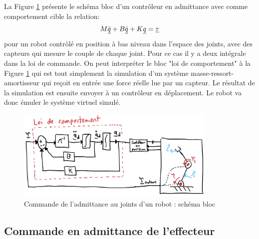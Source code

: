 La Figure \ref{fig:admitancecontroljointspace} présente le schéma bloc d'un contrôleur en admittance avec comme comportement cible la relation:
\begin{align}
M \underline{\ddot{q}} + B \underline{\dot{q}} + K \underline{q} = \underline{\tau}
\end{align}
pour un robot contrôlé en position à bas niveau dans l'espace des joints, avec des capteurs qui mesure le couple de chaque joint. Pour ce cas il y a deux intégrale dans la loi de commande. On peut interpréter le bloc "loi de comportement" à la Figure \ref{fig:admitancecontroljointspace} qui est tout simplement la simulation d'un système masse-ressort-amortisseur qui reçoit en entrée une force réelle lue par un capteur. Le résultat de la simulation est ensuite envoyer à un contrôleur en déplacement. Le robot va donc émuler le système virtuel simulé. 
\begin{figure}[h]
	\centering
		\includegraphics[width=0.85\textwidth]{fig/admitancecontroljointspace.jpg}
	\caption{Commande de l'admittance au joints d'un robot : schéma bloc}
	\label{fig:admitancecontroljointspace}
\end{figure}



\subsection{Commande en admittance de l'effecteur}
\label{sec:effadmcontrol}

